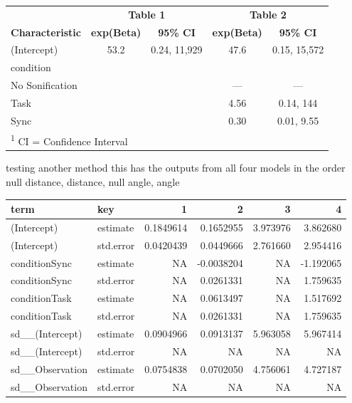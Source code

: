 \documentclass[10pt,a4paper,onecolumn]{article}
\begin{document}
\begin{table}
\centering\begingroup\fontsize{7}{9}\selectfont

\begin{tabular}{l|c|c|c|c}
\hline
\multicolumn{1}{c|}{ } & \multicolumn{2}{c|}{\textbf{Table 1}} & \multicolumn{2}{c}{\textbf{Table 2}} \\
\cline{2-3} \cline{4-5}
\textbf{Characteristic} & \textbf{exp(Beta)} & \textbf{95\% CI} & \textbf{exp(Beta)} & \textbf{95\% CI}\\
\hline
(Intercept) & 53.2 & 0.24, 11,929 & 47.6 & 0.15, 15,572\\
\hline
condition &  &  &  & \\
\hline
\hspace{1em}No Sonification &  &  & — & —\\
\hline
\hspace{1em}Task &  &  & 4.56 & 0.14, 144\\
\hline
\hspace{1em}Sync &  &  & 0.30 & 0.01, 9.55\\
\hline
\multicolumn{5}{l}{\rule{0pt}{1em}\textsuperscript{1} CI = Confidence Interval}\\
\end{tabular}
\endgroup{}
\end{table}

testing another method
this has the outputs from all four models in the order
null distance, distance, null angle, angle

\begin{table}
\centering\begingroup\fontsize{7}{9}\selectfont

\begin{tabular}[t]{l|l|r|r|r|r}
\hline
term & key & 1 & 2 & 3 & 4\\
\hline
(Intercept) & estimate & 0.1849614 & 0.1652955 & 3.973976 & 3.862680\\
\hline
(Intercept) & std.error & 0.0420439 & 0.0449666 & 2.761660 & 2.954416\\
\hline
conditionSync & estimate & NA & -0.0038204 & NA & -1.192065\\
\hline
conditionSync & std.error & NA & 0.0261331 & NA & 1.759635\\
\hline
conditionTask & estimate & NA & 0.0613497 & NA & 1.517692\\
\hline
conditionTask & std.error & NA & 0.0261331 & NA & 1.759635\\
\hline
sd\_\_(Intercept) & estimate & 0.0904966 & 0.0913137 & 5.963058 & 5.967414\\
\hline
sd\_\_(Intercept) & std.error & NA & NA & NA & NA\\
\hline
sd\_\_Observation & estimate & 0.0754838 & 0.0702050 & 4.756061 & 4.727187\\
\hline
sd\_\_Observation & std.error & NA & NA & NA & NA\\
\hline
\end{tabular}
\endgroup{}
\end{table}
\end{document}
